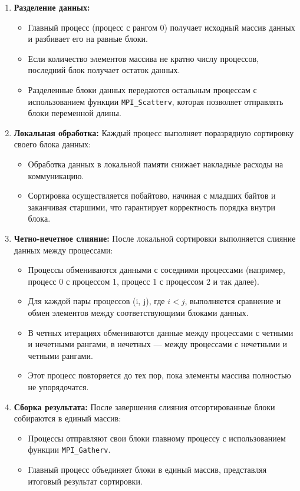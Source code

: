 \documentclass[12pt]{article}
\begin{document}
\begin{enumerate}
    \item \textbf{Разделение данных:} 
    \begin{itemize}
        \item Главный процесс (процесс с рангом 0) получает исходный массив данных и разбивает его на равные блоки.
        \item Если количество элементов массива не кратно числу процессов, последний блок получает остаток данных.
        \item Разделенные блоки данных передаются остальным процессам с использованием функции \texttt{MPI\_Scatterv}, которая позволяет отправлять блоки переменной длины.
    \end{itemize}

    \item \textbf{Локальная обработка:} 
    Каждый процесс выполняет поразрядную сортировку своего блока данных:
    \begin{itemize}
        \item Обработка данных в локальной памяти снижает накладные расходы на коммуникацию.
        \item Сортировка осуществляется побайтово, начиная с младших байтов и заканчивая старшими, что гарантирует корректность порядка внутри блока.
    \end{itemize}

    \item \textbf{Четно-нечетное слияние:} 
    После локальной сортировки выполняется слияние данных между процессами:
    \begin{itemize}
        \item Процессы обмениваются данными с соседними процессами (например, процесс 0 с процессом 1, процесс 1 с процессом 2 и так далее).
        \item Для каждой пары процессов (i, j), где $i < j$, выполняется сравнение и обмен элементов между соответствующими блоками данных.
        \item В четных итерациях обмениваются данные между процессами с четными и нечетными рангами, в нечетных — между процессами с нечетными и четными рангами.
        \item Этот процесс повторяется до тех пор, пока элементы массива полностью не упорядочатся.
    \end{itemize}

    \item \textbf{Сборка результата:} 
    После завершения слияния отсортированные блоки собираются в единый массив:
    \begin{itemize}
        \item Процессы отправляют свои блоки главному процессу с использованием функции \texttt{MPI\_Gatherv}.
        \item Главный процесс объединяет блоки в единый массив, представляя итоговый результат сортировки.
    \end{itemize}
\end{enumerate}
\newpage
\end{document}
